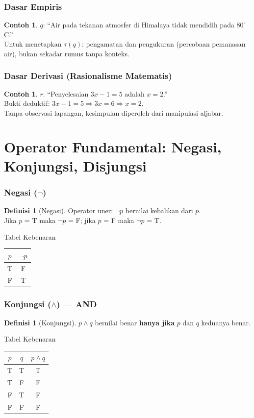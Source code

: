 \documentclass[handout]{beamer}
\theoremstyle{definition}
\newtheorem{definisi}[theorem]{Definisi}
\theoremstyle{example}
\newtheorem{contoh}[theorem]{Contoh}
\begin{document}
\begin{frame}
\frametitle{Dasar Empiris}
\begin{contoh}
$q$: ``Air pada tekanan atmosfer di Himalaya tidak mendidih pada $80^\circ$C.''\\
Untuk menetapkan $\tau(q)$: pengamatan dan pengukuran (percobaan pemanasan air), bukan sekadar rumus tanpa konteks.
\end{contoh}
\end{frame}

\begin{frame}
\frametitle{Dasar Derivasi (Rasionalisme Matematis)}
\begin{contoh}
$r$: ``Penyelesaian $3x - 1 = 5$ adalah $x = 2$.''\\
Bukti deduktif: $3x - 1 = 5 \Rightarrow 3x = 6 \Rightarrow x = 2$.\\
Tanpa observasi lapangan, kesimpulan diperoleh dari manipulasi aljabar.
\end{contoh}
\end{frame}

\section{Operator Fundamental: Negasi, Konjungsi, Disjungsi}

\begin{frame}
\frametitle{Negasi ($\neg$)}
\begin{definisi}[Negasi]
Operator uner: $\neg p$ bernilai kebalikan dari $p$.\\
Jika $p$ = T maka $\neg p$ = F; jika $p$ = F maka $\neg p$ = T.
\end{definisi}
\begin{block}{Tabel Kebenaran}
\begin{tabular}{|c|c|}
\hline
$p$ & $\neg p$ \\ \hline
T & F \\ \hline
F & T \\ \hline
\end{tabular}
\end{block}
\end{frame}

\begin{frame}
\frametitle{Konjungsi ($\wedge$) --- AND}
\begin{definisi}[Konjungsi]
$p \wedge q$ bernilai benar \textbf{hanya jika} $p$ dan $q$ keduanya benar.
\end{definisi}
\begin{block}{Tabel Kebenaran}
\begin{tabular}{|c|c|c|}
\hline
$p$ & $q$ & $p \wedge q$ \\ \hline
T & T & T \\ \hline
T & F & F \\ \hline
F & T & F \\ \hline
F & F & F \\ \hline
\end{tabular}
\end{block}
\end{frame}
\end{document}
